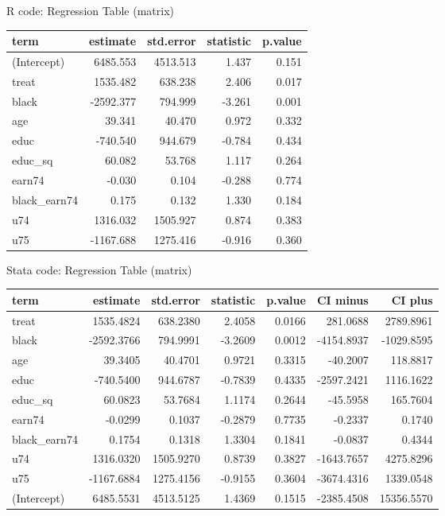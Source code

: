 \documentclass[12pt]{article}
\begin{document}
\begin{center}

R code: Regression Table (matrix)
\par
\begin{tabular}{lrrrr}
  \hline
term & estimate & std.error & statistic & p.value \\
  \hline
(Intercept) & 6485.553 & 4513.513 & 1.437 & 0.151 \\
  treat & 1535.482 & 638.238 & 2.406 & 0.017 \\
  black & -2592.377 & 794.999 & -3.261 & 0.001 \\
  age & 39.341 & 40.470 & 0.972 & 0.332 \\
  educ & -740.540 & 944.679 & -0.784 & 0.434 \\
  educ\_sq & 60.082 & 53.768 & 1.117 & 0.264 \\
  earn74 & -0.030 & 0.104 & -0.288 & 0.774 \\
  black\_earn74 & 0.175 & 0.132 & 1.330 & 0.184 \\
  u74 & 1316.032 & 1505.927 & 0.874 & 0.383 \\
  u75 & -1167.688 & 1275.416 & -0.916 & 0.360 \\
   \hline
\end{tabular}
\par



Stata code: Regression Table (matrix)
\par
\begin{tabular}{lrrrrrr}
  \hline
term & estimate & std.error & statistic & p.value & CI minus &  CI plus \\
  \hline
  treat &  1535.4824 & 638.2380 & 2.4058 & 0.0166 & 281.0688 & 2789.8961 \\
black &  -2592.3766 & 794.9991 & -3.2609 & 0.0012 & -4154.8937 & -1029.8595 \\
  age & 39.3405 & 40.4701 & 0.9721 & 0.3315 & -40.2007 & 118.8817 \\
  educ & -740.5400 & 944.6787 & -0.7839 & 0.4335 & -2597.2421 & 1116.1622 \\
  educ\_sq & 60.0823 & 53.7684 & 1.1174 & 0.2644 & -45.5958 & 165.7604 \\
earn74 & -0.0299 & 0.1037 & -0.2879 & 0.7735 & -0.2337 & 0.1740 \\
  black\_earn74 &  0.1754 & 0.1318 & 1.3304 & 0.1841 & -0.0837 & 0.4344 \\
  u74 & 1316.0320 & 1505.9270 & 0.8739 & 0.3827 & -1643.7657 & 4275.8296 \\
  u75 & -1167.6884 & 1275.4156 & -0.9155 & 0.3604 & -3674.4316 & 1339.0548 \\
(Intercept) & 6485.5531 & 4513.5125 & 1.4369 & 0.1515 & -2385.4508 & 15356.5570 \\
\hline
\end{tabular}
\end{center}
\end{document}
